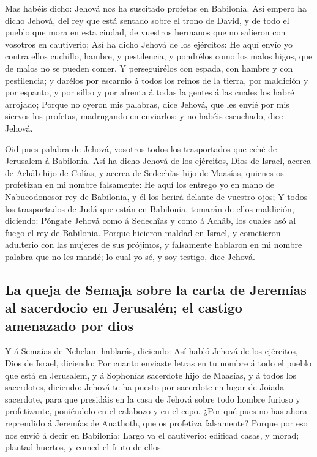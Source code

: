  Mas habéis dicho: Jehová nos ha suscitado profetas en
Babilonia.  Así empero ha dicho Jehová, del rey que está
sentado sobre el trono de David, y de todo el pueblo que mora en esta
ciudad, de vuestros hermanos que no salieron con vosotros en cautiverio;
 Así ha dicho Jehová de los ejércitos: He aquí envío yo
contra ellos cuchillo, hambre, y pestilencia, y pondrélos como los malos
higos, que de malos no se pueden comer.  Y perseguirélos
con espada, con hambre y con pestilencia; y darélos por escarnio á todos
los reinos de la tierra, por maldición y por espanto, y por silbo y por
afrenta á todas la gentes á las cuales los habré arrojado; 
Porque no oyeron mis palabras, dice Jehová, que les envié por mis
siervos los profetas, madrugando en enviarlos; y no habéis escuchado,
dice Jehová.

 Oid pues palabra de Jehová, vosotros todos los
trasportados que eché de Jerusalem á Babilonia.  Así ha
dicho Jehová de los ejércitos, Dios de Israel, acerca de Achâb hijo de
Colías, y acerca de Sedechîas hijo de Maasías, quienes os profetizan en
mi nombre falsamente: He aquí los entrego yo en mano de Nabucodonosor
rey de Babilonia, y él los herirá delante de vuestro ojos; 
Y todos los trasportados de Judá que están en Babilonia, tomarán de
ellos maldición, diciendo: Póngate Jehová como á Sedechîas y como á
Achâb, los cuales asó al fuego el rey de Babilonia.  Porque
hicieron maldad en Israel, y cometieron adulterio con las mujeres de sus
prójimos, y falsamente hablaron en mi nombre palabra que no les mandé;
lo cual yo sé, y soy testigo, dice Jehová.

\hypertarget{la-queja-de-semaja-sobre-la-carta-de-jeremuxedas-al-sacerdocio-en-jerusaluxe9n-el-castigo-amenazado-por-dios}{%
\subsection{La queja de Semaja sobre la carta de Jeremías al sacerdocio
en Jerusalén; el castigo amenazado por
dios}\label{la-queja-de-semaja-sobre-la-carta-de-jeremuxedas-al-sacerdocio-en-jerusaluxe9n-el-castigo-amenazado-por-dios}}

 Y á Semaías de Nehelam hablarás, diciendo: 
Así habló Jehová de los ejércitos, Dios de Israel, diciendo: Por cuanto
enviaste letras en tu nombre á todo el pueblo que está en Jerusalem, y á
Sophonías sacerdote hijo de Maasías, y á todos los sacerdotes, diciendo:
 Jehová te ha puesto por sacerdote en lugar de Joiada
sacerdote, para que presidáis en la casa de Jehová sobre todo hombre
furioso y profetizante, poniéndolo en el calabozo y en el cepo.
 ¿Por qué pues no has ahora reprendido á Jeremías de
Anathoth, que os profetiza falsamente?  Porque por eso nos
envió á decir en Babilonia: Largo va el cautiverio: edificad casas, y
morad; plantad huertos, y comed el fruto de ellos.

